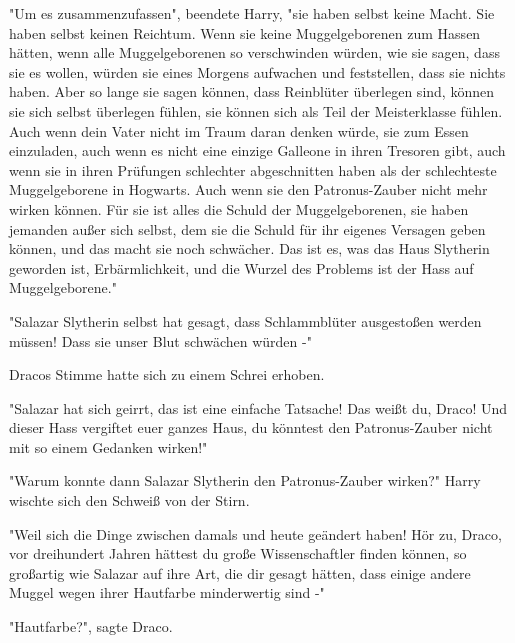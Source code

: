 {"Um es zusammenzufassen", beendete Harry, "sie haben selbst keine Macht. Sie haben selbst keinen Reichtum. Wenn sie keine Muggelgeborenen zum Hassen hätten, wenn alle Muggelgeborenen so verschwinden würden, wie sie sagen, dass sie es wollen, würden sie eines Morgens aufwachen und feststellen, dass sie nichts haben. Aber so lange sie sagen können, dass Reinblüter überlegen sind, können sie sich selbst überlegen fühlen, sie können sich als Teil der Meisterklasse fühlen. Auch wenn dein Vater nicht im Traum daran denken würde, sie zum Essen einzuladen, auch wenn es nicht eine einzige Galleone in ihren Tresoren gibt, auch wenn sie in ihren Prüfungen schlechter abgeschnitten haben als der schlechteste Muggelgeborene in Hogwarts. Auch wenn sie den Patronus-Zauber nicht mehr wirken können. Für sie ist alles die Schuld der Muggelgeborenen, sie haben jemanden außer sich selbst, dem sie die Schuld für ihr eigenes Versagen geben können, und das macht sie noch schwächer. Das ist es, was das Haus Slytherin geworden ist, Erbärmlichkeit, und die Wurzel des Problems ist der Hass auf Muggelgeborene."

"Salazar Slytherin selbst hat gesagt, dass Schlammblüter ausgestoßen werden müssen! Dass sie unser Blut schwächen würden -"

Dracos Stimme hatte sich zu einem Schrei erhoben.

"Salazar hat sich geirrt, das ist eine einfache Tatsache! Das weißt du, Draco! Und dieser Hass vergiftet euer ganzes Haus, du könntest den Patronus-Zauber nicht mit so einem Gedanken wirken!"

"Warum konnte dann Salazar Slytherin den Patronus-Zauber wirken?" Harry wischte sich den Schweiß von der Stirn.

"Weil sich die Dinge zwischen damals und heute geändert haben! Hör zu, Draco, vor dreihundert Jahren hättest du große Wissenschaftler finden können, so großartig wie Salazar auf ihre Art, die dir gesagt hätten, dass einige andere Muggel wegen ihrer Hautfarbe minderwertig sind -"

"Hautfarbe?", sagte Draco.

}
